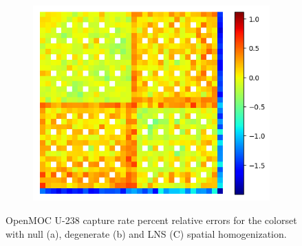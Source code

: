 \begin{figure}[H]
\begin{subfigure}{0.45\textwidth}
  \centering
  \includegraphics[width=\linewidth]{figures/reflector/capt-lns-errors}
  \caption{}
  \label{fig:reflector-capt-lns-error}
\end{subfigure}
\caption{OpenMOC U-238 capture rate percent relative errors for the colorset with null (a), degenerate (b) and LNS (C) spatial homogenization.}
\label{fig:reflector-capt-errors}
\end{figure}

